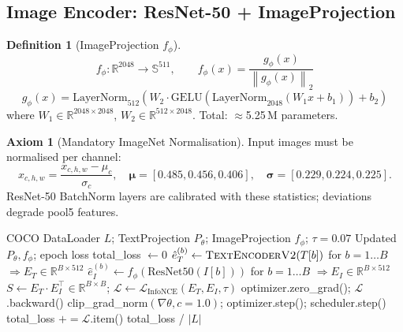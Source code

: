 \documentclass[12pt,a4paper]{article}
\theoremstyle{definition}
\newtheorem{definition}{Definition}[section]
\newtheorem{axiom}{Axiom}[section]
\theoremstyle{plain}
\theoremstyle{remark}
\newcommand{\R}{\mathbb{R}}
\newcommand{\Sph}{\mathbb{S}}
\newcommand{\Norm}[1]{\left\|#1\right\|}
\newcommand{\LN}{\mathrm{LayerNorm}}
\newcommand{\GELU}{\mathrm{GELU}}
\begin{document}
\subsection{Image Encoder: ResNet-50 + ImageProjection}

\begin{definition}[ImageProjection $f_\phi$]
\[
  f_\phi : \R^{2048} \to \Sph^{511}, \qquad
  f_\phi(x) = \frac{g_\phi(x)}{\Norm{g_\phi(x)}_2}
\]
\[
  g_\phi(x) = \LN_{512}\!\left(W_2 \cdot \GELU(\LN_{2048}(W_1 x + b_1)) + b_2\right)
\]
where $W_1 \in \R^{2048 \times 2048}$, $W_2 \in \R^{512 \times 2048}$. Total: $\approx$5.25\,M parameters.
\end{definition}

\begin{axiom}[Mandatory ImageNet Normalisation]
Input images must be normalised per channel:
\[
  \hat{x}_{c,h,w} = \frac{x_{c,h,w} - \mu_c}{\sigma_c}, \quad
  \bm{\mu} = [0.485, 0.456, 0.406], \quad \bm{\sigma} = [0.229, 0.224, 0.225].
\]
ResNet-50 BatchNorm layers are calibrated with these statistics; deviations degrade pool5 features.
\end{axiom}

\begin{algorithm}[H]
\caption{Pipeline A Training Epoch (Symmetric InfoNCE)}
\label{alg:trainepoch_A}
\begin{algorithmic}[1]
\Require COCO DataLoader $L$; TextProjection $P_\theta$; ImageProjection $f_\phi$; $\tau = 0.07$
\Ensure Updated $P_\theta, f_\phi$; epoch loss
\State total\_loss $\gets 0$
  \State $\hat{e}_T^{(b)} \gets \textsc{TextEncoderV2}(T[b])$ for $b=1\ldots B$ \quad $\Rightarrow E_T \in \R^{B \times 512}$
  \State $\hat{e}_I^{(b)} \gets f_\phi(\text{ResNet50}(I[b]))$ for $b=1\ldots B$ \quad $\Rightarrow E_I \in \R^{B \times 512}$
  \State $S \gets E_T \cdot E_I^\top \in \R^{B \times B}$; \quad $\mathcal{L} \gets \mathcal{L}_{\text{InfoNCE}}(E_T, E_I, \tau)$
  \State optimizer.zero\_grad(); $\mathcal{L}$.backward()
  \State clip\_grad\_norm$(\nabla\theta, c=1.0)$; optimizer.step(); scheduler.step()
  \State total\_loss $\mathrel{+}= \mathcal{L}$.item()
\EndFor
\State \Return total\_loss / $|L|$
\end{algorithmic}
\end{algorithm}

\newpage
\end{document}
